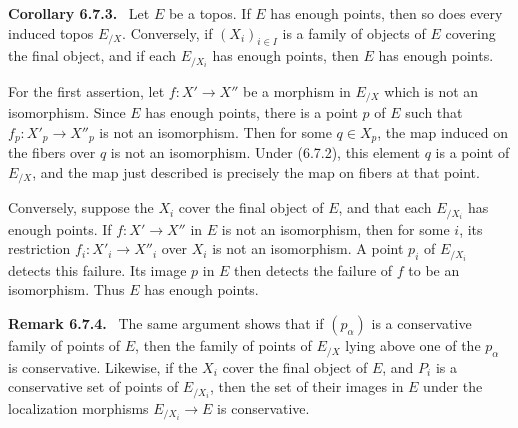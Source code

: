 \documentclass[11pt]{article}
\newenvironment{statement}[1]{\par\medskip\noindent\textbf{#1.}\ }{\par\medskip}
\newenvironment{remarktext}[1]{\par\medskip\noindent\textbf{#1.}\ }{\par\medskip}
\begin{document}
\begin{statement}{Corollary 6.7.3}
Let \(E\) be a topos. If \(E\) has enough points, then so does every induced topos \(E_{/X}\). Conversely, if \((X_i)_{i\in I}\) is a family of objects of \(E\) covering the final object, and if each \(E_{/X_i}\) has enough points, then \(E\) has enough points.
\end{statement}

For the first assertion, let \(f:X'\to X''\) be a morphism in \(E_{/X}\) which is not an isomorphism. Since \(E\) has enough points, there is a point \(p\) of \(E\) such that \(f_p:X'_p\to X''_p\) is not an isomorphism. Then for some \(q\in X_p\), the map induced on the fibers over \(q\) is not an isomorphism. Under (6.7.2), this element \(q\) is a point of \(E_{/X}\), and the map just described is precisely the map on fibers at that point.

Conversely, suppose the \(X_i\) cover the final object of \(E\), and that each \(E_{/X_i}\) has enough points. If \(f:X'\to X''\) in \(E\) is not an isomorphism, then for some \(i\), its restriction \(f_i:X'_i\to X''_i\) over \(X_i\) is not an isomorphism. A point \(p_i\) of \(E_{/X_i}\) detects this failure. Its image \(p\) in \(E\) then detects the failure of \(f\) to be an isomorphism. Thus \(E\) has enough points.

\begin{remarktext}{Remark 6.7.4}
The same argument shows that if \((p_\alpha)\) is a conservative family of points of \(E\), then the family of points of \(E_{/X}\) lying above one of the \(p_\alpha\) is conservative. Likewise, if the \(X_i\) cover the final object of \(E\), and \(P_i\) is a conservative set of points of \(E_{/X_i}\), then the set of their images in \(E\) under the localization morphisms \(E_{/X_i}\to E\) is conservative.
\end{remarktext}
\end{document}
